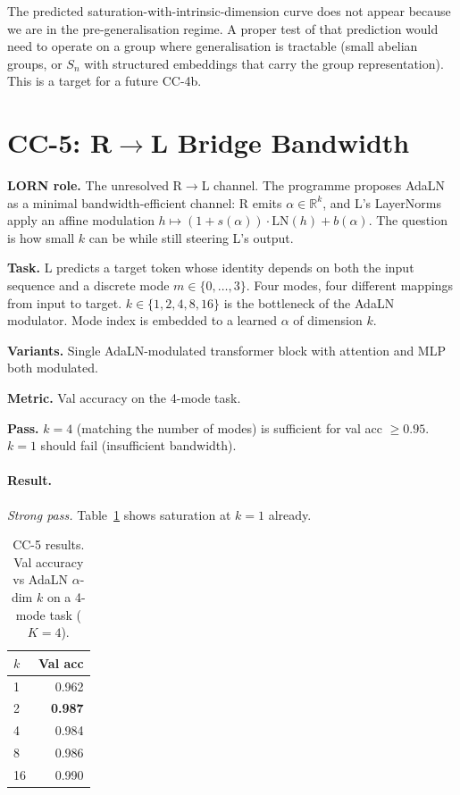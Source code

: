 \documentclass[10pt, twocolumn, a4paper]{article}
\newcommand{\R}{\mathbb{R}}
\begin{document}
The predicted saturation-with-intrinsic-dimension curve does not appear because we are in the pre-generalisation regime. A proper test of that prediction would need to operate on a group where generalisation is tractable (small abelian groups, or $S_n$ with structured embeddings that carry the group representation). This is a target for a future CC-4b.

\section{CC-5: R$\to$L Bridge Bandwidth}

\textbf{LORN role.} The unresolved R$\to$L channel. The programme proposes AdaLN~\cite{peebles2023dit} as a minimal bandwidth-efficient channel: R emits $\alpha \in \R^k$, and L's LayerNorms apply an affine modulation $h \mapsto (1 + s(\alpha)) \cdot \mathrm{LN}(h) + b(\alpha)$. The question is how small $k$ can be while still steering L's output.

\textbf{Task.} L predicts a target token whose identity depends on both the input sequence and a discrete mode $m \in \{0, \dots, 3\}$. Four modes, four different mappings from input to target. $k \in \{1, 2, 4, 8, 16\}$ is the bottleneck of the AdaLN modulator. Mode index is embedded to a learned $\alpha$ of dimension $k$.

\textbf{Variants.} Single AdaLN-modulated transformer block with attention and MLP both modulated.

\textbf{Metric.} Val accuracy on the 4-mode task.

\textbf{Pass.} $k = 4$ (matching the number of modes) is sufficient for val acc $\ge 0.95$. $k = 1$ should fail (insufficient bandwidth).

\paragraph{Result.} \emph{Strong pass.} Table~\ref{tab:cc5} shows saturation at $k=1$ already.

\begin{table}[t]
\centering\small
\caption{CC-5 results. Val accuracy vs AdaLN $\alpha$-dim $k$ on a 4-mode task ($K=4$).}
\label{tab:cc5}
\begin{tabular}{lr}
\toprule
$k$ & Val acc \\
\midrule
1  & 0.962 \\
2  & \textbf{0.987} \\
4  & 0.984 \\
8  & 0.986 \\
16 & 0.990 \\
\bottomrule
\end{tabular}
\end{table}
\end{document}
